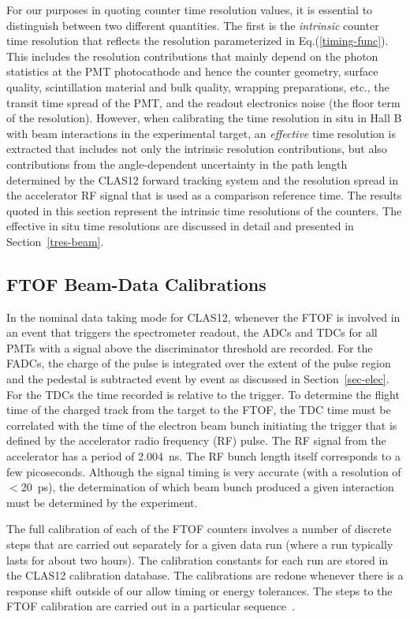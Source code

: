 \documentclass{elsart}
\begin{document}
For our purposes in quoting counter time resolution values, it is essential to distinguish between two
different quantities. The first is the {\em intrinsic} counter time resolution that reflects the resolution
parameterized in Eq.(\ref{timing-func}). This includes the resolution contributions that mainly depend on
the photon statistics at the PMT photocathode and hence the counter geometry, surface quality, scintillation
material and bulk quality, wrapping preparations, etc., the transit time spread of the PMT, and the readout
electronics noise (the floor term of the resolution). However, when calibrating the time resolution in situ in
Hall B with beam interactions in the experimental target, an {\em effective} time resolution is extracted that
includes not only the intrinsic resolution contributions, but also contributions from the angle-dependent
uncertainty in the path length determined by the CLAS12 forward tracking system and the resolution spread
in the accelerator RF signal that is used as a comparison reference time. The results quoted in this section
represent the intrinsic time resolutions of the counters. The effective in situ time resolutions are discussed
in detail and presented in Section~\ref{tres-beam}.

\subsection{FTOF Beam-Data Calibrations}
\label{beam-data-calib}

In the nominal data taking mode for CLAS12, whenever the FTOF is involved in an event that triggers the
spectrometer readout, the ADCs and TDCs for all PMTs with a signal above the discriminator threshold are
recorded. For the FADCs, the charge of the pulse is integrated over the extent of the pulse region and the
pedestal is subtracted event by event as discussed in Section~\ref{sec-elec}. For the TDCs the time
recorded is relative to the trigger. To determine the flight time of the charged track from the target to
the FTOF, the TDC time must be correlated with the time of the electron beam bunch initiating the trigger
that is defined by the accelerator radio frequency (RF) pulse. The RF signal from the accelerator has a period
of 2.004~ns. The RF bunch length itself corresponds to a few picoseconds. Although the signal timing is very
accurate (with a resolution of $<$20~ps), the determination of which beam bunch produced a given interaction
must be determined by the experiment.

The full calibration of each of the FTOF counters involves a number of discrete steps that are carried out
separately for a given data run (where a run typically lasts for about two hours). The calibration constants
for each run are stored in the CLAS12 calibration database. The calibrations are redone whenever there is
a response shift outside of our allow timing or energy tolerances. The steps to the FTOF calibration are
carried out in a particular sequence~\cite{ftof-calib}.
\end{document}
